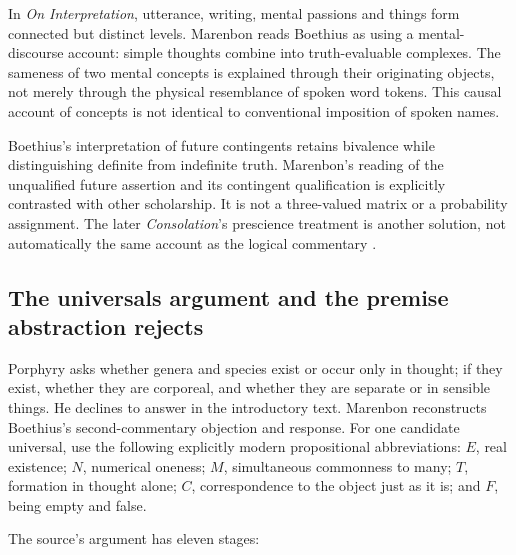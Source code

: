 In \emph{On Interpretation}, utterance, writing, mental passions and
things form connected but distinct levels. Marenbon reads Boethius
as using a mental-discourse account: simple thoughts combine into
truth-evaluable complexes. The sameness of two mental concepts is
explained through their originating objects, not merely through the
physical resemblance of spoken word tokens.
This causal account of concepts is not identical to conventional
imposition of spoken names.

Boethius's interpretation of future contingents retains bivalence
while distinguishing definite from indefinite truth. Marenbon's
reading of the unqualified future assertion and its contingent
qualification is explicitly contrasted with other scholarship.
It is not a three-valued matrix or a probability assignment.
The later \emph{Consolation}'s prescience treatment is another solution,
not automatically the same account as the logical commentary
\cite[pp.~11--12]{Marenbon2007FordhamEarlyLatin}.

\subsection{The universals argument and the premise abstraction rejects}

Porphyry asks whether genera and species exist or occur only in thought;
if they exist, whether they are corporeal, and whether they are separate
or in sensible things. He declines to answer in the introductory text.
Marenbon reconstructs Boethius's second-commentary objection and response.
For one candidate universal, use the following explicitly modern
propositional abbreviations: \(E\), real existence; \(N\), numerical
oneness; \(M\), simultaneous commonness to many; \(T\), formation in
thought alone; \(C\), correspondence to the object just as it is;
and \(F\), being empty and false.

The source's argument has eleven stages:

